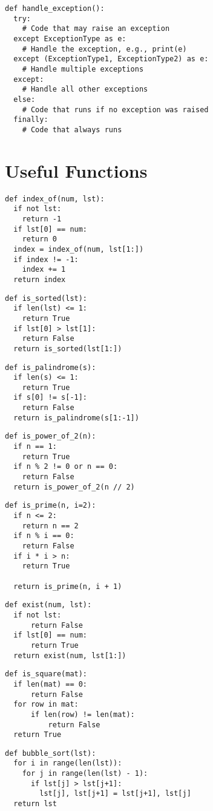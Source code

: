 \documentclass[11pt]{article}
\begin{document}
\begin{lstlisting}
def handle_exception():
  try:
    # Code that may raise an exception
  except ExceptionType as e:
    # Handle the exception, e.g., print(e)
  except (ExceptionType1, ExceptionType2) as e:
    # Handle multiple exceptions
  except:
    # Handle all other exceptions
  else:
    # Code that runs if no exception was raised
  finally:
    # Code that always runs
\end{lstlisting}

\section{Useful Functions}

\begin{multicols}{2}
\begin{lstlisting}
def index_of(num, lst):
  if not lst:
    return -1
  if lst[0] == num:
    return 0
  index = index_of(num, lst[1:])
  if index != -1:
    index += 1
  return index
\end{lstlisting}

\begin{lstlisting}
def is_sorted(lst):
  if len(lst) <= 1:
    return True
  if lst[0] > lst[1]:
    return False
  return is_sorted(lst[1:])
\end{lstlisting}

\begin{lstlisting}
def is_palindrome(s):
  if len(s) <= 1:
    return True
  if s[0] != s[-1]:
    return False
  return is_palindrome(s[1:-1])
\end{lstlisting}

\begin{lstlisting}
def is_power_of_2(n):
  if n == 1:
    return True
  if n % 2 != 0 or n == 0:
    return False
  return is_power_of_2(n // 2)
\end{lstlisting}

\begin{lstlisting}
def is_prime(n, i=2):
  if n <= 2:
    return n == 2
  if n % i == 0:
    return False
  if i * i > n:
    return True
      
  return is_prime(n, i + 1)
\end{lstlisting}

\begin{lstlisting}
def exist(num, lst):
  if not lst:
      return False
  if lst[0] == num:
      return True
  return exist(num, lst[1:])
\end{lstlisting}

\begin{lstlisting}
def is_square(mat):
  if len(mat) == 0:
      return False
  for row in mat:
      if len(row) != len(mat):
          return False
  return True
\end{lstlisting}

\begin{lstlisting}
def bubble_sort(lst):
  for i in range(len(lst)):
    for j in range(len(lst) - 1):
      if lst[j] > lst[j+1]:
        lst[j], lst[j+1] = lst[j+1], lst[j]
  return lst
\end{lstlisting}
\end{multicols}
\end{document}
